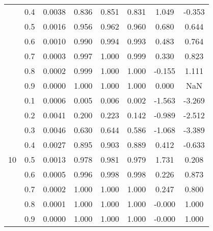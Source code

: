 \documentclass[11pt,a4paper]{report}
\begin{document}
\begin{longtable}{ | c | c || c | c | c | c | c | c | }
 & 0.4 & 0.0038 & 0.836 & 0.851 & 0.831 & 1.049 & -0.353 \\
 & 0.5 & 0.0016 & 0.956 & 0.962 & 0.960 & 0.680 & 0.644 \\
 & 0.6 & 0.0010 & 0.990 & 0.994 & 0.993 & 0.483 & 0.764 \\
 & 0.7 & 0.0003 & 0.997 & 1.000 & 0.999 & 0.330 & 0.823 \\
 & 0.8 & 0.0002 & 0.999 & 1.000 & 1.000 & -0.155 & 1.111 \\
 & 0.9 & 0.0000 & 1.000 & 1.000 & 1.000 & 0.000 & NaN \\
 \hline
\multirow{9}{*}{10} & 0.1 & 0.0006 & 0.005 & 0.006 & 0.002 & -1.563 & -3.269 \\
 & 0.2 & 0.0041 & 0.200 & 0.223 & 0.142 & -0.989 & -2.512 \\
 & 0.3 & 0.0046 & 0.630 & 0.644 & 0.586 & -1.068 & -3.389 \\
 & 0.4 & 0.0027 & 0.895 & 0.903 & 0.889 & 0.412 & -0.633 \\
 & 0.5 & 0.0013 & 0.978 & 0.981 & 0.979 & 1.731 & 0.208 \\
 & 0.6 & 0.0005 & 0.996 & 0.998 & 0.998 & 0.226 & 0.873 \\
 & 0.7 & 0.0002 & 1.000 & 1.000 & 1.000 & 0.247 & 0.800 \\
 & 0.8 & 0.0001 & 1.000 & 1.000 & 1.000 & -0.000 & 1.000 \\
 & 0.9 & 0.0000 & 1.000 & 1.000 & 1.000 & -0.000 & 1.000 \\
 \hline
\hline
\end{longtable}
\end{document}
